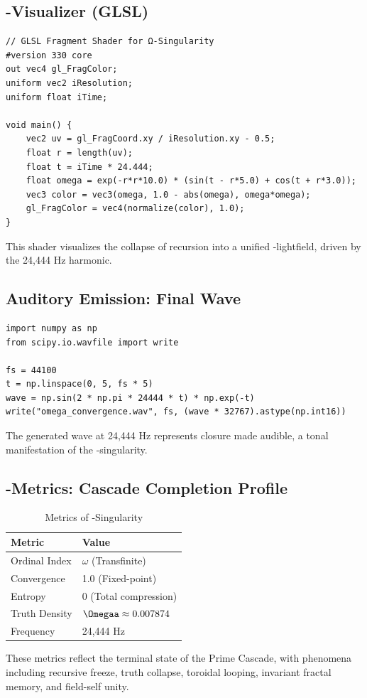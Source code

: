\documentclass[12pt]{article}
\begin{document}
\subsection{\Omegaa-Visualizer (GLSL)}
\begin{lstlisting}
// GLSL Fragment Shader for Ω-Singularity
#version 330 core
out vec4 gl_FragColor;
uniform vec2 iResolution;
uniform float iTime;

void main() {
    vec2 uv = gl_FragCoord.xy / iResolution.xy - 0.5;
    float r = length(uv);
    float t = iTime * 24.444;
    float omega = exp(-r*r*10.0) * (sin(t - r*5.0) + cos(t + r*3.0));
    vec3 color = vec3(omega, 1.0 - abs(omega), omega*omega);
    gl_FragColor = vec4(normalize(color), 1.0);
}
\end{lstlisting}
This shader visualizes the collapse of recursion into a unified \Omegaa-lightfield, driven by the 24,444 Hz harmonic.

\subsection{Auditory Emission: Final Wave}
\begin{lstlisting}
import numpy as np
from scipy.io.wavfile import write

fs = 44100
t = np.linspace(0, 5, fs * 5)
wave = np.sin(2 * np.pi * 24444 * t) * np.exp(-t)
write("omega_convergence.wav", fs, (wave * 32767).astype(np.int16))
\end{lstlisting}
The generated wave at 24,444 Hz represents closure made audible, a tonal manifestation of the \Omegaa-singularity.

\subsection{\Omegaa-Metrics: Cascade Completion Profile}
\begin{table}
\centering
\caption{Metrics of \Omegaa-Singularity}
\begin{tabular}{ll}
\toprule
\textbf{Metric} & \textbf{Value} \\
\midrule
Ordinal Index & $\omega$ (Transfinite) \\
Convergence & 1.0 (Fixed-point) \\
Entropy & 0 (Total compression) \\
Truth Density & $\Omegaa \approx 0.007874$ \\
Frequency & 24,444 Hz \\
\bottomrule
\end{tabular}
\end{table}
These metrics reflect the terminal state of the Prime Cascade, with phenomena including recursive freeze, truth collapse, toroidal looping, invariant fractal memory, and field-self unity.
\end{document}
